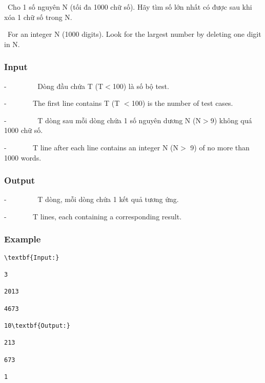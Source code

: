 

 Cho 1 số nguyên N (tối đa 1000 chữ số). Hãy tìm số lớn nhất có được sau khi xóa 1 chữ số trong N.

 For an integer N (1000 digits). Look for the largest number by deleting one digit in N.

\subsubsection{Input}

-         Dòng đầu chứa T (T$<$100) là số bộ test.    

-         The first line contains T (T $<$100) is the number of test cases.

-         T dòng sau mỗi dòng chứa 1 số nguyên dương N (N$>$9) không quá 1000 chữ số.

-         T line after each line contains an integer N (N$>$ 9) of no more than 1000 words.

\subsubsection{Output}

-         T dòng, mỗi dòng chứa 1 kết quả tương ứng.

-         T lines, each containing a corresponding result.

\subsubsection{Example}
\begin{verbatim}
\textbf{Input:}

3

2013

4673

10\textbf{Output:}

213

673

1\end{verbatim}